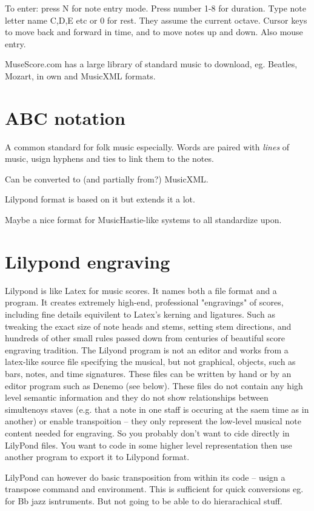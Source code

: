 \documentclass[oneside,english]{scrbook}
\begin{document}
To enter: press N for note entry mode. Press number 1-8 for duration. Type note letter name C,D,E etc or 0 for rest. They assume the current octave.  Cursor keys to move back and forward in time, and to move notes up and down. Also mouse entry.

MuseScore.com has a large library of standard music to download, eg. Beatles, Mozart, in own and MusicXML formats.

\section{ABC notation}

A common standard for folk music especially.   Words are paired with {\em lines} of music, usign hyphens and ties to link them to the notes.

Can be converted to (and partially from?) MusicXML.

Lilypond format is based on it but extends it a lot.

Maybe a nice format for MusicHastie-like systems to all standardize upon.


\section{Lilypond engraving}
Lilypond is like Latex for music scores.  It names both a file format and a program.  It creates extremely high-end, professional "engravings" of scores, including fine details equivilent to Latex's kerning and ligatures. Such as tweaking the exact size of note heads and stems, setting stem directions, and hundreds of other small rules passed down from centuries of beautiful score engraving tradition.   The Lilyond program is not an editor and works from a latex-like source file specifying the musical, but not graphical, objects, such as bars, notes, and time signatures. These files can be written by hand or by an editor program such as Denemo (see below). These files do not contain any high level semantic information and they do not show relationships between simultenoys staves (e.g. that a note in one staff is occuring at the saem time as in another) or enable transpoition -- they only represent the low-level musical note content needed for engraving. So you probably don't want to cide directly in LilyPond files. You want to code in some higher level representation then use another program to export it to Lilypond format. 

LilyPond can however do basic transposition from within its code -- usign a transpose command and environment. This is sufficient for quick conversions eg. for Bb jazz isntruments. But not going to be able to do hierarachical stuff.
\end{document}
